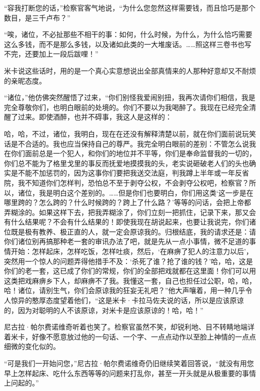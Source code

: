 \par “容我打断您的话，”检察官客气地说，“为什么您忽然这样需要钱，而且恰巧是那个数目，是三千卢布？”
\par “唉，诸位，不必扯那些不相干的事：如何，什么时候，为什么，为什么恰巧需要这么多钱，而不是那么多钱，以及诸如此类的一大堆废话。……照这样三卷书也写不完，还要加上一段后跋哩！”
\par 米卡说这些话时，用的是一个真心实意想说出全部真情来的人那种好意却又不耐烦的亲昵态度。
\par “诸位，”他仿佛突然醒悟了过来，“你们别怪我爱闹别扭，我再次请你们相信，我是完全尊敬你们，也明白眼前的处境的。你们不要以为我喝醉了。我现在已经完全清醒了过来。即使酒醉，也并不碍事，我这人是这样的：
\par 哈，哈，不过，诸位，我明白，现在在还没有解释清楚以前，就在你们面前说玩笑话是不合适的。我也应当保持自己的尊严。我完全明白眼前的差别：不管怎么说我在你们面前总是一个犯人，和你们的地位并不平等，你们是奉命监督我的一切的，你们总不能为了格里戈里的事反而抚爱地摸摸我的头，老实说砸破老人们的头也确实是不能不加惩罚的，因为这事你们要把我送交法庭，判我蹲上半年或一年反省院，我不知道你们怎样判，恐怕总不至于剥夺公权，不会剥夺公权吧，检察官？所以，诸位，我是明白这个差别的。……但是你们也要明白，你们用这类‘这一步是在哪里跨的？怎么跨的？什么时候跨的？跨上了什么路？’等等的问话，会把上帝都弄糊涂的。如果这样下去，把我弄糊涂了，你们立刻一把抓住，记录下来，那又会有什么结果呢？不会有什么结果的！即使我现在胡说起来，也要让我说完，你们诸位既是极有教养、极正直的人，就一定会原谅我的。归根结底，我的请求还是：请你们诸位别再搞那种老一套的审讯办法了吧，就是先从一点小事情，微不足道的事情开始：怎样起床，怎样吃饭，怎样吐痰，然后，‘在麻痹了犯人的注意力以后’，突然用一个惊人的问题弄得他措手不及：‘杀死了谁？抢了谁的钱？’哈，哈，这是你们的老一套，这已成了你们的常规，你们的全部把戏就都在这里面！你们可以用这类把戏麻痹乡下人，却麻痹不了我。我懂这一套，自己也担任过公职，哈，哈，哈！诸位，请别生气，你们会原谅我的狂妄无礼吧？”他大声嚷着，用一种几乎令人惊异的憨厚态度望着他们，“这是米卡·卡拉马佐夫说的话，所以是应该原谅的，因为对聪明的人不该原谅，对米卡是应该原谅的！哈，哈！”
\par 尼古拉·帕尔费诺维奇听着也笑了。检察官虽然不笑，却锐利地、目不转睛地端详着米卡，好像不愿意放过他的一句话、一个字、一点点动作以至脸上神情的一点点细微的变化似的。
\par “可是我们一开始问您，”尼古拉·帕尔费诺维奇仍旧继续笑着回答说，“就没有用您早上怎样起床、吃什么东西等等的问题来打乱你，甚至一开头就是从极重要的事情上问起的。”
